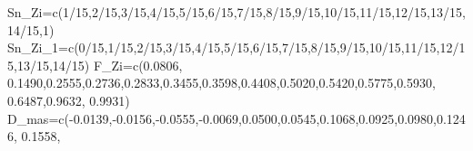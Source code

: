 \documentclass[
  a4paper,
  oneside,
  openany]{book}
\newenvironment{Shaded}{\begin{snugshade}}{\end{snugshade}}
\newcommand{\DecValTok}[1]{\textcolor[rgb]{0.00,0.00,0.81}{#1}}
\newcommand{\FloatTok}[1]{\textcolor[rgb]{0.00,0.00,0.81}{#1}}
\newcommand{\FunctionTok}[1]{\textcolor[rgb]{0.00,0.00,0.00}{#1}}
\newcommand{\NormalTok}[1]{#1}
\newcommand{\OtherTok}[1]{\textcolor[rgb]{0.56,0.35,0.01}{#1}}
\newcommand{\SpecialCharTok}[1]{\textcolor[rgb]{0.00,0.00,0.00}{#1}}
\begin{document}
\begin{Shaded}
\begin{Highlighting}[]
\NormalTok{Sn\_Zi}\OtherTok{=}\FunctionTok{c}\NormalTok{(}\DecValTok{1}\SpecialCharTok{/}\DecValTok{15}\NormalTok{,}\DecValTok{2}\SpecialCharTok{/}\DecValTok{15}\NormalTok{,}\DecValTok{3}\SpecialCharTok{/}\DecValTok{15}\NormalTok{,}\DecValTok{4}\SpecialCharTok{/}\DecValTok{15}\NormalTok{,}\DecValTok{5}\SpecialCharTok{/}\DecValTok{15}\NormalTok{,}\DecValTok{6}\SpecialCharTok{/}\DecValTok{15}\NormalTok{,}\DecValTok{7}\SpecialCharTok{/}\DecValTok{15}\NormalTok{,}\DecValTok{8}\SpecialCharTok{/}\DecValTok{15}\NormalTok{,}\DecValTok{9}\SpecialCharTok{/}\DecValTok{15}\NormalTok{,}\DecValTok{10}\SpecialCharTok{/}\DecValTok{15}\NormalTok{,}\DecValTok{11}\SpecialCharTok{/}\DecValTok{15}\NormalTok{,}\DecValTok{12}\SpecialCharTok{/}\DecValTok{15}\NormalTok{,}\DecValTok{13}\SpecialCharTok{/}\DecValTok{15}\NormalTok{,}\DecValTok{14}\SpecialCharTok{/}\DecValTok{15}\NormalTok{,}\DecValTok{1}\NormalTok{)}
\NormalTok{Sn\_Zi\_1}\OtherTok{=}\FunctionTok{c}\NormalTok{(}\DecValTok{0}\SpecialCharTok{/}\DecValTok{15}\NormalTok{,}\DecValTok{1}\SpecialCharTok{/}\DecValTok{15}\NormalTok{,}\DecValTok{2}\SpecialCharTok{/}\DecValTok{15}\NormalTok{,}\DecValTok{3}\SpecialCharTok{/}\DecValTok{15}\NormalTok{,}\DecValTok{4}\SpecialCharTok{/}\DecValTok{15}\NormalTok{,}\DecValTok{5}\SpecialCharTok{/}\DecValTok{15}\NormalTok{,}\DecValTok{6}\SpecialCharTok{/}\DecValTok{15}\NormalTok{,}\DecValTok{7}\SpecialCharTok{/}\DecValTok{15}\NormalTok{,}\DecValTok{8}\SpecialCharTok{/}\DecValTok{15}\NormalTok{,}\DecValTok{9}\SpecialCharTok{/}\DecValTok{15}\NormalTok{,}\DecValTok{10}\SpecialCharTok{/}\DecValTok{15}\NormalTok{,}\DecValTok{11}\SpecialCharTok{/}\DecValTok{15}\NormalTok{,}\DecValTok{12}\SpecialCharTok{/}\DecValTok{15}\NormalTok{,}\DecValTok{13}\SpecialCharTok{/}\DecValTok{15}\NormalTok{,}\DecValTok{14}\SpecialCharTok{/}\DecValTok{15}\NormalTok{)}
\NormalTok{F\_Zi}\OtherTok{=}\FunctionTok{c}\NormalTok{(}\FloatTok{0.0806}\NormalTok{, }\FloatTok{0.1490}\NormalTok{,}\FloatTok{0.2555}\NormalTok{,}\FloatTok{0.2736}\NormalTok{,}\FloatTok{0.2833}\NormalTok{,}\FloatTok{0.3455}\NormalTok{,}\FloatTok{0.3598}\NormalTok{,}\FloatTok{0.4408}\NormalTok{,}\FloatTok{0.5020}\NormalTok{,}\FloatTok{0.5420}\NormalTok{,}\FloatTok{0.5775}\NormalTok{,}\FloatTok{0.5930}\NormalTok{,}
       \FloatTok{0.6487}\NormalTok{,}\FloatTok{0.9632}\NormalTok{, }\FloatTok{0.9931}\NormalTok{)}
\NormalTok{D\_mas}\OtherTok{=}\FunctionTok{c}\NormalTok{(}\SpecialCharTok{{-}}\FloatTok{0.0139}\NormalTok{,}\SpecialCharTok{{-}}\FloatTok{0.0156}\NormalTok{,}\SpecialCharTok{{-}}\FloatTok{0.0555}\NormalTok{,}\SpecialCharTok{{-}}\FloatTok{0.0069}\NormalTok{,}\FloatTok{0.0500}\NormalTok{,}\FloatTok{0.0545}\NormalTok{,}\FloatTok{0.1068}\NormalTok{,}\FloatTok{0.0925}\NormalTok{,}\FloatTok{0.0980}\NormalTok{,}\FloatTok{0.1246}\NormalTok{, }\FloatTok{0.1558}\NormalTok{,}

\end{Highlighting}
\end{Shaded}
\end{document}
